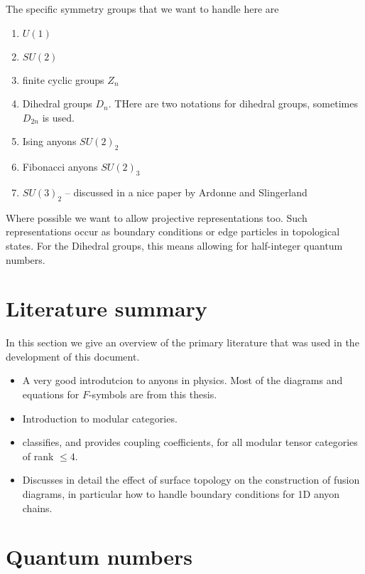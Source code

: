 \documentclass[12pt]{article}
\begin{document}
The specific symmetry groups that we want to handle here are
\begin{enumerate}
\item $U(1)$
\item $SU(2)$
\item finite cyclic groups $Z_n$
\item Dihedral groups $D_n$. THere are two notations for dihedral groups, sometimes $D_{2n}$ is used.
\item Ising anyons $SU(2)_2$
\item Fibonacci anyons $SU(2)_3$
\item $SU(3)_2$ -- discussed in a nice paper by Ardonne and Slingerland\cite{Ardonne}
\end{enumerate}
Where possible we want to allow projective representations too. Such representations occur
as boundary conditions or edge particles in topological states. For the Dihedral
groups, this means allowing for half-integer quantum numbers.

\section{Literature summary}

In this section we give an overview of the primary literature that was used in the development of this document.

\begin{itemize}
\item \cite{Bonderson} A very good introdutcion to anyons in physics. Most of the diagrams and equations for $F$-symbols
are from this thesis.
\item \cite{MTC} Introduction to modular categories.
\item \cite{MTCClassification} classifies, and provides coupling coefficients, for all
modular tensor categories of rank $\leq 4$.
\item \cite{Pfeifer} Discusses in detail the effect of surface topology on the construction of fusion diagrams, in
particular how to handle boundary conditions for 1D anyon chains.
\end{itemize}

\section{Quantum numbers}
\end{document}
